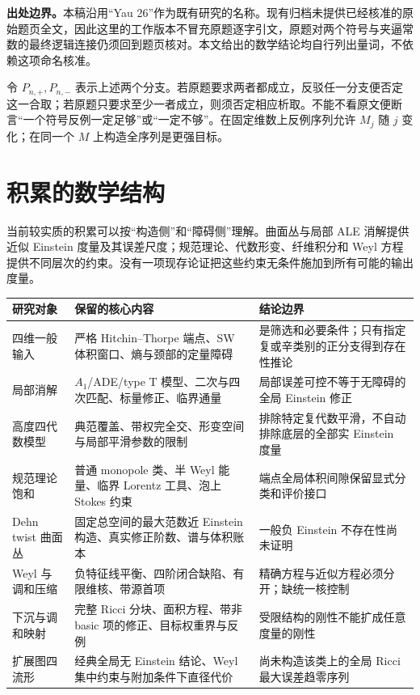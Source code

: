 \documentclass[UTF8,fontset=fandol,zihao=-4,oneside,openany]{ctexbook}
\theoremstyle{cjkplain}
\numberwithin{equation}{chapter}
\begin{document}
\textbf{出处边界。}本稿沿用“Yau 26”作为既有研究的名称。现有归档未提供已经核准的原始题页全文，因此这里的工作版本不冒充原题逐字引文，原题对两个符号与夹逼常数的最终逻辑连接仍须回到题页核对。本文给出的数学结论均自行列出量词，不依赖这项命名核准。

令 $P_{n,+},P_{n,-}$ 表示上述两个分支。若原题要求两者都成立，反驳任一分支便否定这一合取；若原题只要求至少一者成立，则须否定相应析取。不能不看原文便断言“一个符号反例一定足够”或“一定不够”。在固定维数上反例序列允许 $M_j$ 随 $j$ 变化；在同一个 $M$ 上构造全序列是更强目标。

\section*{积累的数学结构}
当前较实质的积累可以按“构造侧”和“障碍侧”理解。曲面丛与局部 ALE 消解提供近似 Einstein 度量及其误差尺度；规范理论、代数形变、纤维积分和 Weyl 方程提供不同层次的约束。没有一项现存论证把这些约束无条件施加到所有可能的输出度量。

\begin{longtable}{p{}p{}p{}}
\toprule
研究对象 & 保留的核心内容 & 结论边界\\
\midrule
\endhead
四维一般输入 & 严格 Hitchin--Thorpe 端点、SW 体积窗口、熵与颈部的定量障碍 & 是筛选和必要条件；只有指定复或辛类别的正分支得到存在性推论\\
局部消解 & $A_1$/ADE/type T 模型、二次与四次匹配、标量修正、临界通量 & 局部误差可控不等于无障碍的全局 Einstein 修正\\
高度四代数模型 & 典范覆盖、带权完全交、形变空间与局部平滑参数的限制 & 排除特定复代数平滑，不自动排除底层的全部实 Einstein 度量\\
规范理论饱和 & 普通 monopole 类、半 Weyl 能量、临界 Lorentz 工具、泡上 Stokes 约束 & 端点全局体积间隙保留显式分类和评价接口\\
Dehn twist 曲面丛 & 固定总空间的最大范数近 Einstein 构造、真实修正阶数、谱与体积账本 & 一般负 Einstein 不存在性尚未证明\\
Weyl 与调和压缩 & 负特征线平衡、四阶闭合缺陷、有限维核、带源首项 & 精确方程与近似方程必须分开；缺统一核控制\\
下沉与调和映射 & 完整 Ricci 分块、面积方程、带非 basic 项的修正、目标权重界与反例 & 受限结构的刚性不能扩成任意度量的刚性\\
扩展图四流形 & 经典全局无 Einstein 结论、Weyl 集中约束与附加条件下直径代价 & 尚未构造该类上的全局 Ricci 最大误差趋零序列\\
\bottomrule
\end{longtable}
\end{document}
